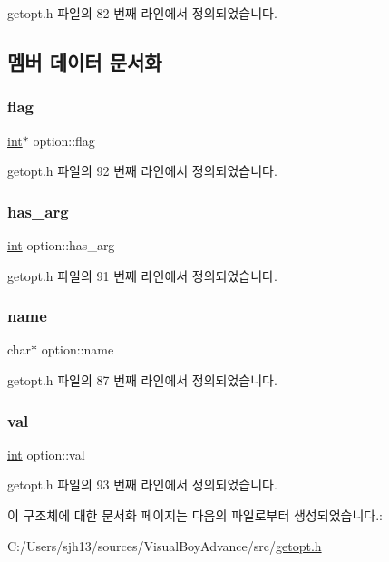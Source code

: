getopt.\+h 파일의 82 번째 라인에서 정의되었습니다.



\subsection{멤버 데이터 문서화}
\mbox{\label{structoption_ab366eea5fe7be25c1928328ba715e353}} 
\subsubsection{\texorpdfstring{flag}{flag}}
{\footnotesize\ttfamily \mbox{\hyperlink{_util_8cpp_a0ef32aa8672df19503a49fab2d0c8071}{int}}$\ast$ option\+::flag}



getopt.\+h 파일의 92 번째 라인에서 정의되었습니다.

\mbox{\label{structoption_a90d7ee9a51eea5c002682dbd0af149e4}} 
\subsubsection{\texorpdfstring{has\+\_\+arg}{has\_arg}}
{\footnotesize\ttfamily \mbox{\hyperlink{_util_8cpp_a0ef32aa8672df19503a49fab2d0c8071}{int}} option\+::has\+\_\+arg}



getopt.\+h 파일의 91 번째 라인에서 정의되었습니다.

\mbox{\label{structoption_a92c850a23c7828c1dba453bf8d15e1f0}} 
\subsubsection{\texorpdfstring{name}{name}}
{\footnotesize\ttfamily char$\ast$ option\+::name}



getopt.\+h 파일의 87 번째 라인에서 정의되었습니다.

\mbox{\label{structoption_a13bd155ec3b405d29c41ab8d0793be11}} 
\subsubsection{\texorpdfstring{val}{val}}
{\footnotesize\ttfamily \mbox{\hyperlink{_util_8cpp_a0ef32aa8672df19503a49fab2d0c8071}{int}} option\+::val}



getopt.\+h 파일의 93 번째 라인에서 정의되었습니다.



이 구조체에 대한 문서화 페이지는 다음의 파일로부터 생성되었습니다.\+:\begin{DoxyCompactItemize}
\item 
C\+:/\+Users/sjh13/sources/\+Visual\+Boy\+Advance/src/\mbox{\hyperlink{getopt_8h}{getopt.\+h}}\end{DoxyCompactItemize}

